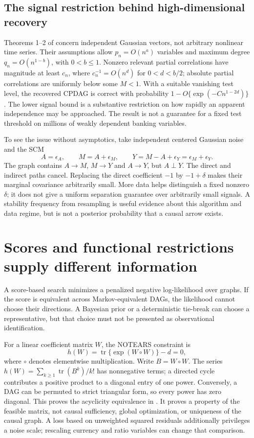 \subsection{The signal restriction behind high-dimensional recovery}
Theorems 1--2 of \citet{kalisch2007} concern independent Gaussian
vectors, not arbitrary nonlinear time series. Their assumptions allow
$p_n=O(n^a)$ variables and maximum degree $q_n=O(n^{1-b})$, with
$0<b\le1$. Nonzero relevant partial correlations have magnitude at
least $c_n$, where $c_n^{-1}=O(n^d)$ for $0<d<b/2$; absolute partial
correlations are uniformly below some $M<1$. With a suitable vanishing
test level, the recovered CPDAG is correct with probability
$1-O\{\exp(-Cn^{1-2d})\}$. The lower signal bound is a substantive
restriction on how rapidly an apparent independence may be approached.
The result is not a guarantee for a fixed test threshold on millions of
weakly dependent banking variables.

To see the issue without asymptotics, take independent centered Gaussian
noise and the SCM
\[
 A=\epsilon_A,\qquad M=A+\epsilon_M,\qquad
 Y=M-A+\epsilon_Y=\epsilon_M+\epsilon_Y.
\]
The graph contains $A\to M$, $M\to Y$ and $A\to Y$, but $A\perp Y$.
The direct and indirect paths cancel. Replacing the direct coefficient
$-1$ by $-1+\delta$ makes their marginal covariance arbitrarily small.
More data helps distinguish a fixed nonzero $\delta$; it does not give
a uniform separation guarantee over arbitrarily small signals. A
stability frequency from resampling is useful evidence about this
algorithm and data regime, but is not a posterior probability that a
causal arrow exists.

\section{Scores and functional restrictions supply different information}
\label{r3:discovery-scores}
A score-based search minimizes a penalized negative log-likelihood over
graphs. If the score is equivalent across Markov-equivalent DAGs, the
likelihood cannot choose their directions. A Bayesian prior or a
deterministic tie-break can choose a representative, but that choice
must not be presented as observational identification.

For a linear coefficient matrix $W$, the NOTEARS constraint is
\begin{equation}
 h(W)=\operatorname{tr}\{\exp(W\circ W)\}-d=0,
 \label{r3:notears}
\end{equation}
where $\circ$ denotes elementwise multiplication. Write $B=W\circ W$.
The series $h(W)=\sum_{k\ge1}\operatorname{tr}(B^k)/k!$ has
nonnegative terms; a directed cycle contributes a positive product to
a diagonal entry of one power. Conversely, a DAG can be permuted to
strict triangular form, so every power has zero diagonal. This proves
the acyclicity equivalence in \citet[Theorem 1]{notears2018}.
It proves a property of the feasible matrix, not causal sufficiency,
global optimization, or uniqueness of the causal graph. A loss based
on unweighted squared residuals additionally privileges a noise scale;
rescaling currency and ratio variables can change that comparison.


